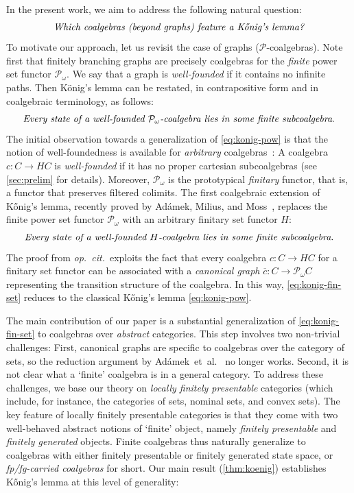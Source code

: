 \documentclass[10pt,a4paper]{article}
\theoremstyle{definition}
\theoremstyle{remark}
\numberwithin{equation}{section}
\newcommand{\Konig}{Kőnig}
\newcommand{\lfplong}{locally finitely presentable\xspace}
\newcommand{\lfp}{\lfplong}
\newcommand{\Pow}{\mathcal{P}}
\newcommand{\Powf}{\mathcal{P}_{\omega}}
\newcommand{\ol}{\overline}
\theoremstyle{plain}
\theoremstyle{definition}
\begin{document}
In the present work, we aim to address the following natural question:
\[ \emph{Which coalgebras (beyond graphs) feature a \Konig's lemma?} \]
To motivate our approach, let us revisit the case of graphs ($\Pow$-coalgebras). Note first that finitely branching graphs are precisely coalgebras for the \emph{finite} power set functor $\Powf$. We say that a graph is \emph{well-founded} if it contains no infinite paths. Then König's lemma can be restated, in contrapositive form and in coalgebraic terminology, as follows:
\begin{equation}\label{eq:konig-pow} \emph{Every state of a well-founded $\Powf$-coalgebra lies in some finite subcoalgebra}. \end{equation}
The initial observation towards a generalization of \eqref{eq:konig-pow} is that the notion of well-foundedness is available for \emph{arbitrary} coalgebras~\cite{taylor99,amm25}: A coalgebra $c\colon C\to HC$ is \emph{well-founded} if it has no proper {cartesian} subcoalgebras (see \autoref{sec:prelim} for details). Moreover, $\Powf$ is the prototypical \emph{finitary} functor, that is, a functor that preserves filtered colimits. The first coalgebraic extension of \Konig's lemma, recently proved by Ad\'amek, Milius, and Moss~\cite[Prop.~9.2.19]{amm25}, replaces the finite power set functor $\Powf$ with an arbitrary finitary set functor $H$:
\begin{equation}\label{eq:konig-fin-set} \emph{Every state of a well-founded $H$-coalgebra lies in some finite subcoalgebra}. \end{equation}
The proof from \emph{op.~cit.}\ exploits the fact that every coalgebra $c\colon C\to HC$ for a finitary set functor can be associated with a \emph{canonical graph} $\ol{c}\colon C\to \Powf C$ representing the transition structure of the coalgebra. In this way, \eqref{eq:konig-fin-set} reduces to the classical \Konig's lemma \eqref{eq:konig-pow}. 

The main contribution of our paper is a substantial generalization of \eqref{eq:konig-fin-set} to coalgebras over \emph{abstract} categories. This step involves two non-trivial challenges: First, canonical graphs are specific to coalgebras over the category of sets, so the reduction argument by Ad\'amek~et~al.~\cite{amm25} no longer works. Second, it is not clear what a `finite' coalgebra is in a general category. To address these challenges, we base our theory on \emph{\lfp} categories (which include, for instance, the categories of sets, nominal sets, and convex sets). The key feature of \lfplong categories is that they come with two well-behaved abstract notions of `finite' object, namely \emph{finitely presentable} and \emph{finitely generated} objects. Finite coalgebras thus naturally generalize to coalgebras with either finitely presentable or finitely generated state space, or \emph{fp/fg-carried coalgebras} for short. Our main result (\autoref{thm:koenig}) establishes \Konig's lemma at this level of generality:
\end{document}
